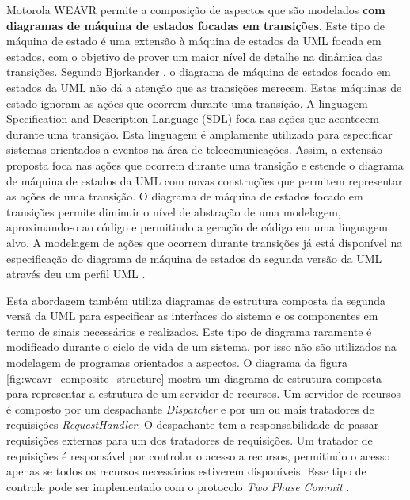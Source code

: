 Motorola WEAVR permite a composição de aspectos que são modelados \textbf{com diagramas de máquina de estados focadas em transições}. Este tipo de
máquina de estado é uma extensão à máquina de estados da UML focada em estados, com o objetivo de prover um maior nível de detalhe na dinâmica das
transições. Segundo Bjorkander \cite{Bjorkander:2000:GPU:619058.621607}, o diagrama de máquina de estados focado em estados da UML não dá a atenção
que as transições merecem. Estas máquinas de estado ignoram as ações que ocorrem durante uma transição. A linguagem Specification and Description Language
(SDL)  \cite{sdl:00} foca nas ações que acontecem durante uma transição. Esta linguagem é
amplamente utilizada para especificar sistemas orientados a eventos na área de telecomunicações. Assim, a extensão proposta foca nas ações que ocorrem
durante uma transição e estende o diagrama de máquina de estados da UML com novas construções que permitem representar as ações de uma transição. O
diagrama de máquina de estados focado em transições permite diminuir o nível de abstração de uma modelagem, aproximando-o ao código
e permitindo a geração de código em uma linguagem alvo. A modelagem de ações que ocorrem durante transições já está disponível na especificação
do diagrama de máquina de estados da segunda versão da UML através deu um perfil UML \cite{uml:05}.

Esta abordagem também utiliza diagramas de estrutura composta da segunda versã da UML para especificar as interfaces do sistema e os componentes em
termo de sinais necessários e realizados. Este tipo de diagrama raramente é modificado durante o ciclo de vida de um sistema, por isso não são
utilizados na modelagem de programas orientados a aspectos. O diagrama da figura \ref{fig:weavr_composite_structure} mostra um diagrama de estrutura
composta para representar a estrutura de um servidor de recursos. Um servidor de recursos é composto por um despachante \textit{Dispatcher} e por um
ou mais tratadores de requisições \textit{RequestHandler}. O despachante tem a responsabilidade de passar requisições externas para um dos tratadores
de requisições. Um tratador de requisições é responsável por controlar o acesso a recursos, permitindo o acesso apenas se todos os recursos
necessários estiverem disponíveis. Esse tipo de controle pode ser implementado com o protocolo \textit{Two Phase Commit} .

